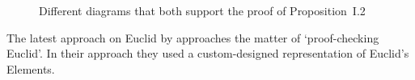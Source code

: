 \documentclass[]{interact}
\theoremstyle{plain}
\theoremstyle{definition}
\theoremstyle{remark}
\newcommand{\quotes}[1]{`#1'}
\begin{document}
\begin{figure}
  \centering

  \hspace{3pt}


  \caption{Different diagrams that both support the proof of Proposition~I.2}
  \label{fig:prop-i2}
\end{figure}


The latest approach on Euclid
by \citet{beeson-etal:2019} approaches the matter of
\quotes{proof-checking Euclid}.
In their approach they used a custom-designed representation of
Euclid's Elements.
\end{document}
